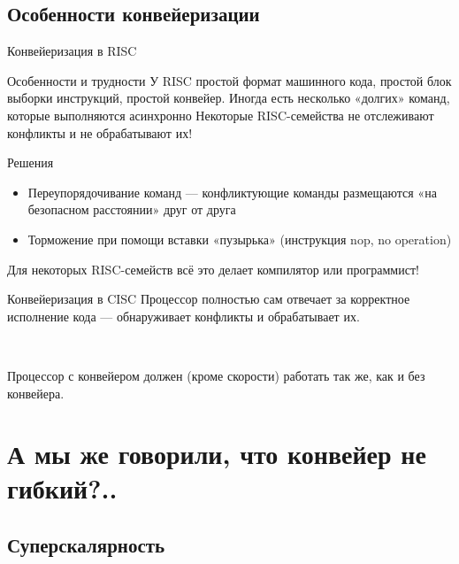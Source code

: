 \documentclass[xetex,aspectratio=43]{beamer}
\begin{document}
\subsection{Особенности конвейеризации}

\begin{frame}{Конвейеризация в RISC}
    \begin{block}{Особенности и трудности}
        У RISC простой формат машинного кода, простой блок выборки инструкций, простой конвейер.
        Иногда есть несколько «долгих» команд, которые выполняются асинхронно
                \alert{Некоторые RISC-семейства не отслеживают конфликты и не обрабатывают их!}
    \end{block}

    \pause

    \begin{block}{Решения}
        \begin{itemize}
            \item Переупорядочивание команд — конфликтующие команды размещаются «на безопасном расстоянии» друг от друга
            \item Торможение при помощи вставки «пузырька» (инструкция nop, no operation)
        \end{itemize}
        \alert{Для некоторых RISC-семейств всё это делает компилятор или программист!}
    \end{block}
\end{frame}

\begin{frame}{Конвейеризация в CISC}
    Процессор полностью сам отвечает за корректное исполнение кода --- обнаруживает конфликты и обрабатывает их.

    ~

    Процессор с конвейером должен (кроме скорости) работать так же, как и без конвейера.
\end{frame}

\section{А мы же говорили, что конвейер не гибкий?..}

\subsection{Суперскалярность}
\end{document}
